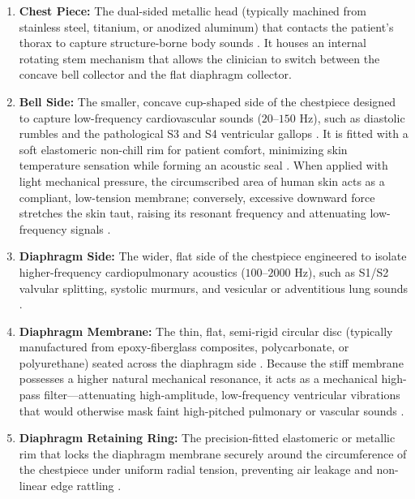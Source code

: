 \begin{enumerate}
    \item \textbf{Chest Piece:} The dual-sided metallic head (typically machined from stainless steel, titanium, or anodized aluminum) that contacts the patient's thorax to capture structure-borne body sounds \cite{weinberg1993color, indosurgicals2024}. It houses an internal rotating stem mechanism that allows the clinician to switch between the concave bell collector and the flat diaphragm collector.
    
    \item \textbf{Bell Side:} The smaller, concave cup-shaped side of the chestpiece designed to capture low-frequency cardiovascular sounds ($20\text{--}150\text{ Hz}$), such as diastolic rumbles and the pathological S3 and S4 ventricular gallops \cite{ertel1966stethoscope}. It is fitted with a soft elastomeric non-chill rim for patient comfort, minimizing skin temperature sensation while forming an acoustic seal \cite{indosurgicals2024}. When applied with light mechanical pressure, the circumscribed area of human skin acts as a compliant, low-tension membrane; conversely, excessive downward force stretches the skin taut, raising its resonant frequency and attenuating low-frequency signals \cite{ertel1966stethoscope}.
    
    \item \textbf{Diaphragm Side:} The wider, flat side of the chestpiece engineered to isolate higher-frequency cardiopulmonary acoustics ($100\text{--}2000\text{ Hz}$), such as S1/S2 valvular splitting, systolic murmurs, and vesicular or adventitious lung sounds \cite{weinberg1993color, leng2015electronic, indosurgicals2024}.
    
    \item \textbf{Diaphragm Membrane:} The thin, flat, semi-rigid circular disc (typically manufactured from epoxy-fiberglass composites, polycarbonate, or polyurethane) seated across the diaphragm side \cite{indosurgicals2024}. Because the stiff membrane possesses a higher natural mechanical resonance, it acts as a mechanical high-pass filter—attenuating high-amplitude, low-frequency ventricular vibrations that would otherwise mask faint high-pitched pulmonary or vascular sounds \cite{ertel1966stethoscope, leng2015electronic}.
    
    \item \textbf{Diaphragm Retaining Ring:} The precision-fitted elastomeric or metallic rim that locks the diaphragm membrane securely around the circumference of the chestpiece under uniform radial tension, preventing air leakage and non-linear edge rattling \cite{indosurgicals2024}.
    

\end{enumerate}
